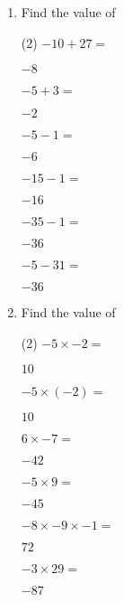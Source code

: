 \begin{enumerate} [leftmargin=0cm]
\item   Find the value of              
 \begin{tasks}[label=(\alph*), after-item-skip=2pt,after-skip=3pt, label-width=4ex](2)               
  \task $-10+27 =$        \begin{envFillIn}$     -8  $ \end{envFillIn}
  \task $ -5+3 = $        \begin{envFillIn}$     -2  $ \end{envFillIn}
  \task $ -5-1 =$        \begin{envFillIn}$     -6  $ \end{envFillIn}
  \task $ -15-1 = $        \begin{envFillIn}$     -16  $ \end{envFillIn}
  \task $ -35-1 = $        \begin{envFillIn}$     -36  $ \end{envFillIn}
  \task $ -5-31 = $        \begin{envFillIn}$     -36  $ \end{envFillIn}
 \end{tasks}               


\item Find the value of
\begin{tasks}[label=(\alph*), after-item-skip=2pt,after-skip=3pt, label-width=4ex](2)
    \task  $ -5 \times -2 =                 $                           \begin{envFillIn}$  10      $ \end{envFillIn}
    \task  $ -5 \times (-2) =               $                           \begin{envFillIn}$  10      $    \end{envFillIn}
    \task  $  6 \times -7 =                 $                           \begin{envFillIn}$  -42     $    \end{envFillIn}
    \task  $ -5 \times 9 =                  $                           \begin{envFillIn}$  -45     $    \end{envFillIn}
    \task  $ -8 \times -9 \times -1 =       $                           \begin{envFillIn}$  72      $    \end{envFillIn}
    \task  $ -3 \times 29 =                 $                           \begin{envFillIn}$  -87     $    \end{envFillIn}
\end{tasks}


\end{enumerate}
